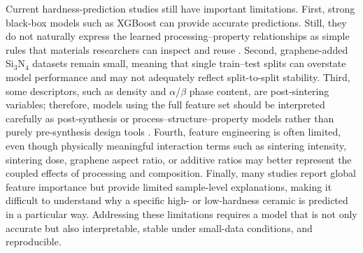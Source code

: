 \documentclass[pdflatex,sn-mathphys-num]{sn-jnl}%
\theoremstyle{thmstyleone}%
\theoremstyle{thmstyletwo}%
\theoremstyle{thmstylethree}%
\begin{document}
Current hardness-prediction studies still have important limitations. First, strong black-box models such as XGBoost can provide accurate predictions. Still, they do not naturally express the learned processing--property relationships as simple rules that materials researchers can inspect and reuse \cite{qadir2024predicting, butler2018machine, lundberg2017unified}. Second, graphene-added Si$_3$N$_4$ datasets remain small, meaning that single train--test splits can overstate model performance and may not adequately reflect split-to-split stability. Third, some descriptors, such as density and $\alpha$/$\beta$ phase content, are post-sintering variables; therefore, models using the full feature set should be interpreted carefully as post-synthesis or process--structure--property models rather than purely pre-synthesis design tools \cite{qadir2024predicting}. Fourth, feature engineering is often limited, even though physically meaningful interaction terms such as sintering intensity, sintering dose, graphene aspect ratio, or additive ratios may better represent the coupled effects of processing and composition. Finally, many studies report global feature importance but provide limited sample-level explanations, making it difficult to understand why a specific high- or low-hardness ceramic is predicted in a particular way. Addressing these limitations requires a model that is not only accurate but also interpretable, stable under small-data conditions, and reproducible.
\end{document}
